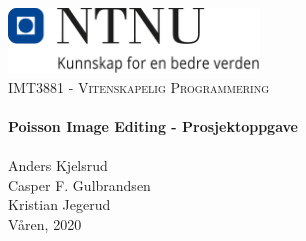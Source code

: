 \begin{titlepage}
\vbox{ }
\vbox{ }
\begin{center}
\includegraphics[width=0.50\textwidth]{images/NTNU_logo.png}\\[0.7cm]
\textsc{\LARGE IMT3881 - Vitenskapelig Programmering}\\[0.4cm]
\vbox{ }
\HRule \\[0.4cm]
{\huge \bfseries Poisson Image Editing - Prosjektoppgave}\\[0.4cm]
\HRule \\[1.5cm]

\large
Anders Kjelsrud \\
Casper F. Gulbrandsen \\
Kristian Jegerud \\
\vfill
{\large Våren, 2020}
\end{center}
\end{titlepage}